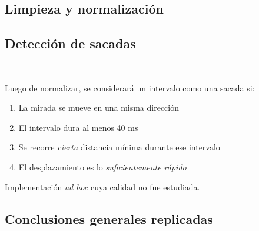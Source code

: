 \documentclass[aspectratio=169]{beamer}
\begin{document}
\subsection{Limpieza y normalización}

\subsection{Detección de sacadas}

\begin{frame}{~}

  Luego de normalizar, se considerará un intervalo como una sacada si:
  \begin{enumerate}
    \item La mirada se mueve en una misma dirección
    \item El intervalo dura al menos 40 ms
    \item Se recorre \textit{cierta} distancia mínima durante ese intervalo
    \item El desplazamiento es lo \textit{suficientemente rápido}
  \end{enumerate}
  Implementación \textit{ad hoc} cuya calidad no fue estudiada.

\end{frame}

\subsection{Conclusiones generales replicadas}
\end{document}
